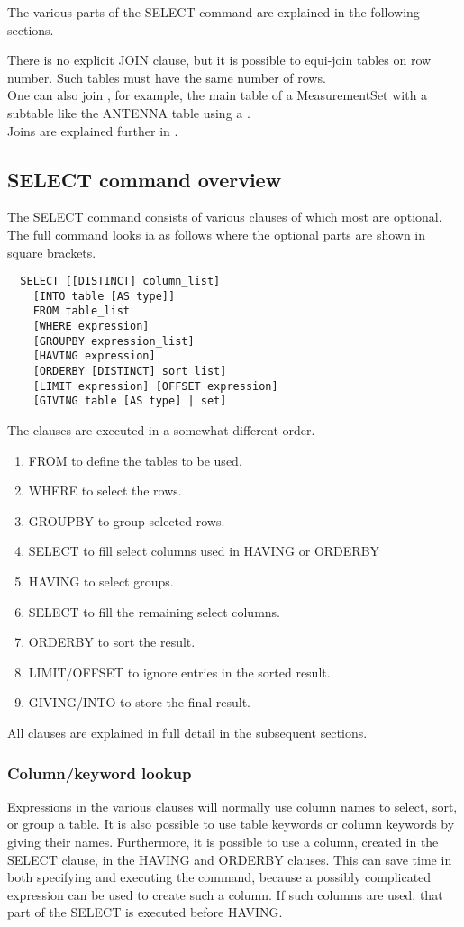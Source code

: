 The various parts of the SELECT command are explained in the following
sections.

There is no explicit JOIN clause, but it is possible to
equi-join tables on row number.
Such tables must have the same number of rows.
\\One can also join , for example, the main table of a
MeasurementSet with a subtable like the ANTENNA table using a
.
\\Joins are explained further in .

\subsection{SELECT command overview}
The SELECT command consists of various clauses of which most are
optional. The full command looks ia as follows where the optional
parts are shown in square brackets.
\begin{verbatim}
  SELECT [[DISTINCT] column_list]
    [INTO table [AS type]]
    FROM table_list
    [WHERE expression]
    [GROUPBY expression_list]
    [HAVING expression]
    [ORDERBY [DISTINCT] sort_list]
    [LIMIT expression] [OFFSET expression]
    [GIVING table [AS type] | set]
\end{verbatim}
The clauses are executed in a somewhat different order.
\begin{enumerate}
\item FROM to define the tables to be used.
\item WHERE to select the rows.
\item GROUPBY to group selected rows.
\item SELECT to fill select columns used in HAVING or ORDERBY
\item HAVING to select groups.
\item SELECT to fill the remaining select columns.
\item ORDERBY to sort the result.
\item LIMIT/OFFSET to ignore entries in the sorted result.
\item GIVING/INTO to store the final result.
\end{enumerate}
All clauses are explained in full detail in the subsequent sections.

\subsubsection{Column/keyword lookup}
Expressions in the various clauses will normally use column names to
select, sort, or group a table. It is also possible to use table
keywords or column keywords by giving their names.
Furthermore, it is possible to use a column,
created in the SELECT clause, in the HAVING and ORDERBY clauses. This
can save time in both specifying and executing the command, because
a possibly complicated expression can be used to create such a column. If such
columns are used, that part of the SELECT is executed before HAVING.

